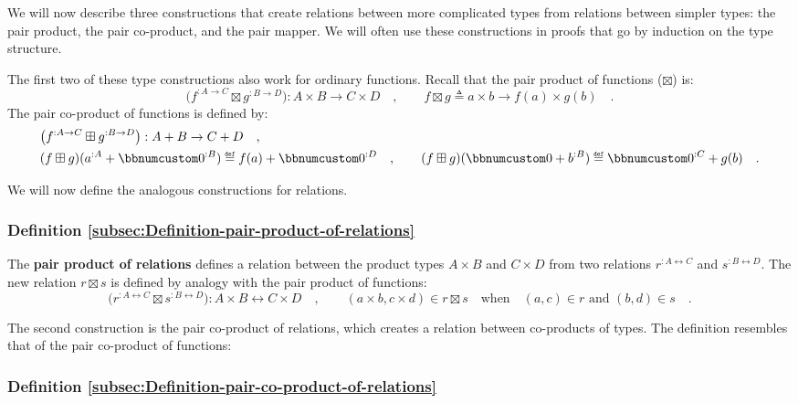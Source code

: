 We will now describe three constructions that create relations between
more complicated types from relations between simpler types: the pair
product, the pair co-product, and the pair mapper. We will often use
these constructions in proofs that go by induction on the type structure.

The first two of these type constructions also work for ordinary functions.
Recall that the pair product of functions
($\boxtimes$) is:
\[
\big(f^{:A\rightarrow C}\boxtimes g^{:B\rightarrow D}\big):A\times B\rightarrow C\times D\quad,\quad\quad f\boxtimes g\triangleq a\times b\rightarrow f(a)\times g(b)\quad.
\]
The pair co-product of functions
is defined by:
\begin{align*}
 & \big(f^{:A\rightarrow C}\boxplus g^{:B\rightarrow D}\big):A+B\rightarrow C+D\quad,\\
 & (f\boxplus g)(a^{:A}+\bbnum 0^{:B})\triangleq f(a)+\bbnum 0^{:D}\quad,\quad\quad(f\boxplus g)(\bbnum 0+b^{:B})\triangleq\bbnum 0^{:C}+g(b)\quad.
\end{align*}

We will now define the analogous constructions for relations.

\subsubsection{Definition \label{subsec:Definition-pair-product-of-relations}\ref{subsec:Definition-pair-product-of-relations}}

The \textbf{pair product of relations}
defines a relation between the product types $A\times B$ and $C\times D$
from two relations $r^{:A\leftrightarrow C}$ and $s^{:B\leftrightarrow D}$.
The new relation $r\boxtimes s$ is defined by analogy with the pair
product of functions:
\[
\big(r^{:A\leftrightarrow C}\boxtimes s^{:B\leftrightarrow D}\big):A\times B\leftrightarrow C\times D\quad,\quad\quad(a\times b,c\times d)\in r\boxtimes s\quad\text{when}\quad(a,c)\in r\text{ and }(b,d)\in s\quad.
\]

The second construction is the pair co-product of relations,
which creates a relation between co-products of types. The definition
resembles that of the pair co-product
of functions:

\subsubsection{Definition \label{subsec:Definition-pair-co-product-of-relations}\ref{subsec:Definition-pair-co-product-of-relations}}

